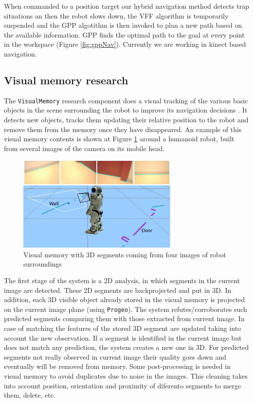 \documentclass[twocolumn]{svjour3}          %
\begin{document}
When commanded to a position target our hybrid navigation method detects trap situations an then the robot slows down, the VFF algorithm is temporarily suspended and the GPP algotithm is then invoked to plan a new path based on the available information. GPP finds the optimal path to the goal at every point in the workspace (Figure \ref{fig:gppNav}). Currently we are working in kinect based navigation.

\subsection{Visual memory research}

The \texttt{VisualMemory} research component does a visual tracking of the various basic objects in the scene surrounding the robot to improve its navigation decisions \cite{canas2012}. It detects new objects, tracks them updating their relative position to the robot and remove them from the memory once they have disappeared. An example of this visual memory contents is shown at Figure \ref{fig:memory} around a humanoid robot, built from several images of the camera on its mobile head.

\begin{figure}[h!]
\includegraphics[width=8cm]{experimentoReal.jpg}
\caption{Visual memory with 3D segments coming from four images of robot surroundings}
\label{fig:memory}
\end{figure}

The first stage of the system is a 2D analysis, in which segments in the current image are detected. These 2D segments are backprojected and put in 3D. In addition, each 3D visible object already stored in the visual memory is projected on the current image plane (using \texttt{Progeo}). The system refutes/corroborates such predicted segments comparing them with those extracted from current image. In case of matching the features of the stored 3D segment are updated taking into account the new observation. If a segment is identified in the current image but does not match any prediction, the system creates a new one in 3D. For predicted segments not really observed in current image their quality goes down and eventually will be removed from memory. Some post-processing is needed in visual memory to avoid duplicates due to noise in the images. This cleaning takes into account position, orientation and proximity of diferento segments to merge them, delete, etc.
\end{document}
